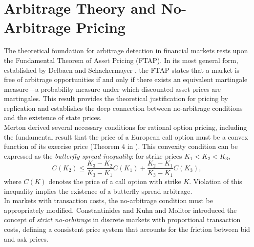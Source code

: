 \documentclass[openany]{book}
\numberwithin{figure}{chapter}
\numberwithin{equation}{chapter}
\begin{document}
\section{Arbitrage Theory and No-Arbitrage Pricing}

The theoretical foundation for arbitrage detection in financial markets rests upon the Fundamental Theorem of Asset Pricing (FTAP). In its most general form, established by Delbaen and Schachermayer \cite{delbaen1994}, the FTAP states that a market is free of arbitrage opportunities if and only if there exists an equivalent martingale measure---a probability measure under which discounted asset prices are martingales. This result provides the theoretical justification for pricing by replication and establishes the deep connection between no-arbitrage conditions and the existence of state prices.\\

Merton \cite{merton1973} derived several necessary conditions for rational option pricing, including the fundamental result that the price of a European call option must be a convex function of its exercise price (Theorem 4 in \cite{merton1973}). This convexity condition can be expressed as the \textit{butterfly spread inequality}: for strike prices $K_1 < K_2 < K_3$,
\begin{equation}
C(K_2) \leq \frac{K_3 - K_2}{K_3 - K_1} C(K_1) + \frac{K_2 - K_1}{K_3 - K_1} C(K_3),
\label{eq:butterfly}
\end{equation}
where $C(K)$ denotes the price of a call option with strike $K$. Violation of this inequality implies the existence of a butterfly spread arbitrage.\\

In markets with transaction costs, the no-arbitrage condition must be appropriately modified. Constantinides \cite{constantinides1986} and Kuhn and Molitor \cite{kuhn2008} introduced the concept of \textit{strict no-arbitrage} in discrete markets with proportional transaction costs, defining a consistent price system that accounts for the friction between bid and ask prices.\\
\end{document}
